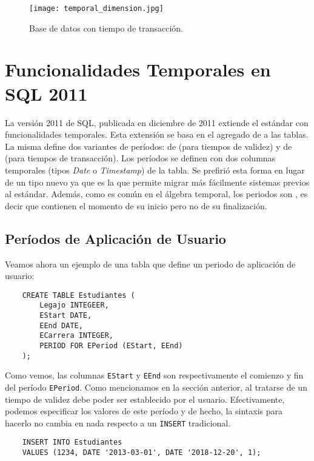 \begin{figure}
    \centering
    \texttt{[image: temporal\_dimension.jpg]}
    \caption{Base de datos con tiempo de transacción.}
    \label{fig:transaction-time}
\end{figure}

\section{Funcionalidades Temporales en SQL 2011}\label{sec:sql2011}

La versión 2011 de SQL\textsuperscript{\cite{sql2011}}, publicada en diciembre de 2011 extiende el estándar con funcionalidades temporales.
Esta extensión se basa en el agregado de  a las tablas.
La misma define dos variantes de períodos:
de  (para tiempos de validez) y de  (para tiempos de transacción).
Los períodos se definen con dos columnas temporales (tipos \textit{Date} o \textit{Timestamp}) de la tabla.
Se prefirió esta forma en lugar de un tipo nuevo ya que es la que permite migrar más
fácilmente sistemas previos al estándar.
Además, como es común en el álgebra temporal, los periodos son ,
es decir que contienen el momento de su inicio pero no de su finalización.

\subsection{Períodos de Aplicación de Usuario} \label{subsec:pau}

Veamos ahora un ejemplo de una tabla que define un periodo de aplicación de usuario:

\begin{verbatim}
    CREATE TABLE Estudiantes (
        Legajo INTEGEER,
        EStart DATE,
        EEnd DATE,
        ECarrera INTEGER,
        PERIOD FOR EPeriod (EStart, EEnd)
    );
\end{verbatim}

Como vemos, las columnas \texttt{EStart} y \texttt{EEnd} son respectivamente el comienzo y fin del período \texttt{EPeriod}.
Como mencionamos en la sección anterior, al tratarse de un tiempo de validez debe poder ser establecido por el usuario.
Efectivamente, podemos especificar los valores de este período y de hecho,
la sintaxis para hacerlo no cambia en nada respecto a un \texttt{INSERT} tradicional.

\begin{verbatim}
    INSERT INTO Estudiantes
    VALUES (1234, DATE '2013-03-01', DATE '2018-12-20', 1);
\end{verbatim}

